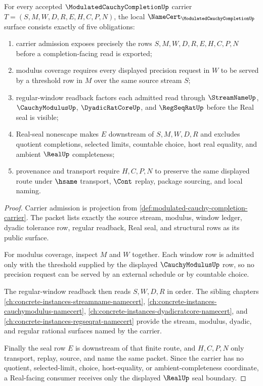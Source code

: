 \begin{theorem}
\label{thm:modulated-cauchy-completion-namecert-obligations}
For every accepted $\ModulatedCauchyCompletionUp$ carrier $T=(S,M,W,D,R,E,H,C,P,N)$, the local $\NameCert_{\ModulatedCauchyCompletionUp}$ surface consists exactly of five obligations:
\begin{enumerate}
\item carrier admission exposes precisely the rows $S,M,W,D,R,E,H,C,P,N$ before a completion-facing read is exported;
\item modulus coverage requires every displayed precision request in $W$ to be served by a threshold row in $M$ over the same source stream $S$;
\item regular-window readback factors each admitted read through $\StreamNameUp$, $\CauchyModulusUp$, $\DyadicRatCoreUp$, and $\RegSeqRatUp$ before the Real seal is visible;
\item Real-seal nonescape makes $E$ downstream of $S,M,W,D,R$ and excludes quotient completions, selected limits, countable choice, host real equality, and ambient $\RealUp$ completeness;
\item provenance and transport require $H,C,P,N$ to preserve the same displayed route under $\hsame$ transport, $\Cont$ replay, package sourcing, and local naming.
\end{enumerate}
\end{theorem}
\begin{proof}
Carrier admission is projection from \autoref{def:modulated-cauchy-completion-carrier}. The packet lists exactly the source stream, modulus, window ledger, dyadic tolerance row, regular readback, Real seal, and structural rows as its public surface.

For modulus coverage, inspect $M$ and $W$ together. Each window row is admitted only with the threshold supplied by the displayed $\CauchyModulusUp$ row, so no precision request can be served by an external schedule or by countable choice.

The regular-window readback then reads $S,W,D,R$ in order. The sibling chapters \autoref{ch:concrete-instances-streamname-namecert}, \autoref{ch:concrete-instances-cauchymodulus-namecert}, \autoref{ch:concrete-instances-dyadicratcore-namecert}, and \autoref{ch:concrete-instances-regseqrat-namecert} provide the stream, modulus, dyadic, and regular rational surfaces named by the carrier.

Finally the seal row $E$ is downstream of that finite route, and $H,C,P,N$ only transport, replay, source, and name the same packet. Since the carrier has no quotient, selected-limit, choice, host-equality, or ambient-completeness coordinate, a Real-facing consumer receives only the displayed $\RealUp$ seal boundary.
\end{proof}

